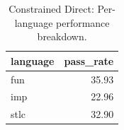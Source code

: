 \begin{table}[htbp]
  \centering
  \caption{Constrained Direct: Per-language performance breakdown.}
  \label{tab:lang_breakdown_constrained_direct}
  \begin{tabular}{lr}
    \toprule
    language & pass\_rate \\
    \midrule
    fun & 35.93 \\
    imp & 22.96 \\
    stlc & 32.90 \\
    \bottomrule
  \end{tabular}
\end{table}